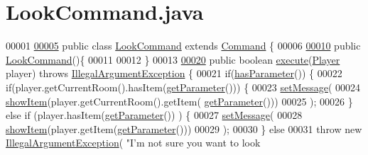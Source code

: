 \hypertarget{LookCommand_8java_source}{\section{Look\-Command.\-java}
}

\begin{DoxyCode}
00001 
\hypertarget{LookCommand_8java_source_l00005}{}\hyperlink{classLookCommand}{00005} \textcolor{keyword}{public} \textcolor{keyword}{class }\hyperlink{classLookCommand}{LookCommand} \textcolor{keyword}{extends} \hyperlink{classCommand}{Command} \{
00006 
\hypertarget{LookCommand_8java_source_l00010}{}\hyperlink{classLookCommand_a45ae975cf9e99310d630cfe440d5ce75}{00010}     \textcolor{keyword}{public} \hyperlink{classLookCommand_a45ae975cf9e99310d630cfe440d5ce75}{LookCommand}()\{
00011 
00012     \}
00013 
\hypertarget{LookCommand_8java_source_l00020}{}\hyperlink{classLookCommand_a3b67eafb4956b1369904b273303ee7df}{00020}     \textcolor{keyword}{public} \textcolor{keywordtype}{boolean} \hyperlink{classLookCommand_a3b67eafb4956b1369904b273303ee7df}{execute}(\hyperlink{classPlayer}{Player} player) \textcolor{keywordflow}{throws} 
      \hyperlink{classIllegalArgumentException}{IllegalArgumentException} \{
00021         \textcolor{keywordflow}{if}(\hyperlink{classCommand_a9b042558156d6749566e0fd9d48d3bfe}{hasParameter}()) \{
00022             \textcolor{keywordflow}{if}(player.getCurrentRoom().hasItem(\hyperlink{classCommand_a1ced3739d546770ba1389e6ce228255e}{getParameter}())) \{
00023                 \hyperlink{classCommand_a715709d8f0ab65879d79ad1725c96f17}{setMessage}(
00024                         \hyperlink{classLookCommand_ad96c354dee73acf189f99e988a796bc7}{showItem}(player.getCurrentRoom().getItem(
      \hyperlink{classCommand_a1ced3739d546770ba1389e6ce228255e}{getParameter}()))
00025                         );
00026             \} \textcolor{keywordflow}{else} \textcolor{keywordflow}{if} (player.hasItem(\hyperlink{classCommand_a1ced3739d546770ba1389e6ce228255e}{getParameter}()) ) \{
00027                 \hyperlink{classCommand_a715709d8f0ab65879d79ad1725c96f17}{setMessage}(
00028                         \hyperlink{classLookCommand_ad96c354dee73acf189f99e988a796bc7}{showItem}(player.getItem(\hyperlink{classCommand_a1ced3739d546770ba1389e6ce228255e}{getParameter}()))
00029                         );
00030             \} \textcolor{keywordflow}{else}
00031                 \textcolor{keywordflow}{throw} \textcolor{keyword}{new} \hyperlink{classIllegalArgumentException}{IllegalArgumentException}( \textcolor{stringliteral}{"I'm not sure you want to look
}
\end{DoxyCode}
